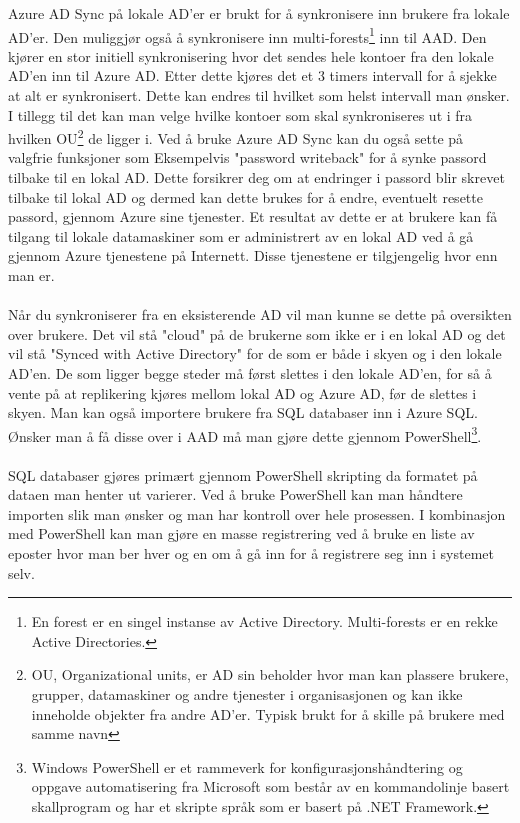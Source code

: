 Azure AD Sync på lokale AD'er er brukt for å synkronisere inn brukere fra lokale AD'er. Den muliggjør også å synkronisere inn multi-forests\footnote{En forest er en singel instanse av Active Directory. Multi-forests er en rekke Active Directories.} inn til AAD. Den kjører en stor initiell synkronisering hvor det sendes hele kontoer fra den lokale AD'en inn til Azure AD. Etter dette kjøres det et 3 timers intervall for å sjekke at alt er synkronisert. Dette kan endres til hvilket som helst intervall man ønsker. I tillegg til det kan man velge hvilke kontoer som skal synkroniseres ut i fra hvilken OU\footnote{OU, Organizational units, er AD sin beholder hvor man kan plassere brukere, grupper, datamaskiner og andre tjenester i organisasjonen og kan ikke inneholde objekter fra andre AD'er. Typisk brukt for å skille på brukere med samme navn} de ligger i. Ved å bruke Azure AD Sync kan du også sette på valgfrie funksjoner som  Eksempelvis "password writeback" for å synke passord tilbake til en lokal AD. Dette forsikrer deg om at endringer i passord blir skrevet tilbake til lokal AD og dermed kan dette brukes for å endre, eventuelt resette passord, gjennom Azure sine tjenester. Et resultat av dette er at brukere kan få tilgang til lokale datamaskiner som er administrert av en lokal AD ved å gå gjennom Azure tjenestene på Internett. Disse tjenestene er tilgjengelig hvor enn man er. \\
\\
Når du synkroniserer fra en eksisterende AD vil man kunne se dette på oversikten over brukere. Det vil stå "cloud" på de brukerne som ikke er i en lokal AD og det vil stå "Synced with Active Directory" for de som er både i skyen og i den lokale AD'en. De som ligger begge steder må først slettes i den lokale AD'en, for så å vente på at replikering kjøres mellom lokal AD og Azure AD, før de slettes i skyen. Man kan også importere brukere fra SQL databaser inn i Azure SQL. Ønsker man å få disse over i AAD må man gjøre dette gjennom PowerShell\footnote{Windows PowerShell er et rammeverk for konfigurasjonshåndtering og oppgave automatisering fra Microsoft som består av en kommandolinje basert skallprogram og har et skripte språk som er basert på .NET Framework.}. \\
\\
SQL databaser gjøres primært gjennom PowerShell skripting da formatet på dataen man henter ut varierer. Ved å bruke PowerShell kan man håndtere importen slik man ønsker og man har kontroll over hele prosessen. I kombinasjon med PowerShell kan man gjøre en masse registrering ved å bruke en liste av eposter hvor man ber hver og en om å gå inn for å registrere seg inn i systemet selv.

